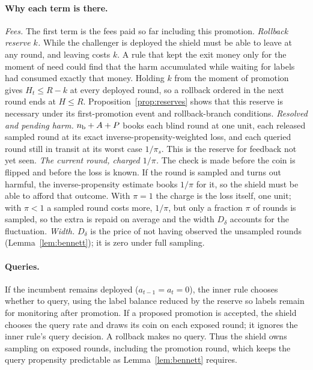 \documentclass[10pt]{article}
\theoremstyle{plain}
\theoremstyle{definition}
\begin{document}
\paragraph{Why each term is there.}
\emph{Fees.} The first term is the fees paid so far including this promotion.
\emph{Rollback reserve $k$.} While the challenger is deployed the shield must be able to leave at any round, and leaving costs $k$. A rule that kept the exit money only for the moment of need could find that the harm accumulated while waiting for labels had consumed exactly that money. Holding $k$ from the moment of promotion gives $H_t\le R-k$ at every deployed round, so a rollback ordered in the next round ends at $H\le R$. Proposition~\ref{prop:reserves} shows that this reserve is necessary under its first-promotion event and rollback-branch conditions.
\emph{Resolved and pending harm.} $n_{\rm b}+A+P$ books each blind round at one unit, each released sampled round at its exact inverse-propensity-weighted loss, and each queried round still in transit at its worst case $1/\pi_s$. This is the reserve for feedback not yet seen.
\emph{The current round, charged $1/\pi$.} The check is made before the coin is flipped and before the loss is known. If the round is sampled and turns out harmful, the inverse-propensity estimate books $1/\pi$ for it, so the shield must be able to afford that outcome. With $\pi=1$ the charge is the loss itself, one unit; with $\pi<1$ a sampled round costs more, $1/\pi$, but only a fraction $\pi$ of rounds is sampled, so the extra is repaid on average and the width $D_\delta$ accounts for the fluctuation.
\emph{Width.} $D_\delta$ is the price of not having observed the unsampled rounds (Lemma~\ref{lem:bennett}); it is zero under full sampling.

\paragraph{Queries.}
If the incumbent remains deployed ($a_{t-1}=a_t=0$), the inner rule chooses whether to query, using the label balance reduced by the reserve so labels remain for monitoring after promotion. If a proposed promotion is accepted, the shield chooses the query rate and draws its coin on each exposed round; it ignores the inner rule's query decision. A rollback makes no query. Thus the shield owns sampling on exposed rounds, including the promotion round, which keeps the query propensity predictable as Lemma~\ref{lem:bennett} requires.
\end{document}
